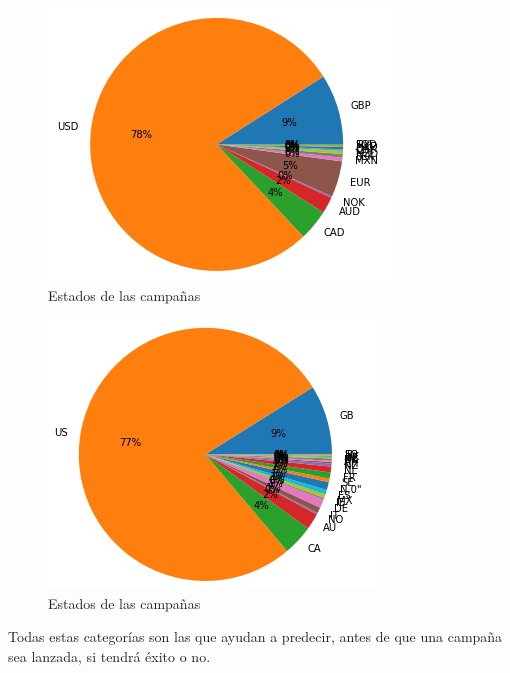 \documentclass[journal]{IEEEtran}
\begin{document}
\begin{figure}[H]
    \centering
    \captionsetup{justification=centering}
\includegraphics[width=\linewidth]{Images/Currency.png}
    \caption{Estados de las campañas}
\end{figure}


\begin{figure}[H]
    \centering
    \captionsetup{justification=centering}
\includegraphics[width=\linewidth]{Images/Country.png}
    \caption{Estados de las campañas}
\end{figure}

Todas estas categorías son las que ayudan a predecir, antes de que una campaña sea lanzada, si tendrá éxito o no.
\end{document}
